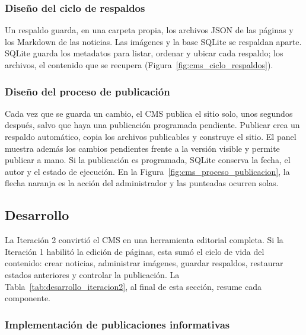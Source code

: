 

\subsubsection{Diseño del ciclo de respaldos}

Un respaldo guarda, en una carpeta propia, los archivos JSON de las páginas y los Markdown de las noticias. Las imágenes y la base SQLite se respaldan aparte. SQLite guarda los metadatos para listar, ordenar y ubicar cada respaldo; los archivos, el contenido que se recupera (Figura~\ref{fig:cms_ciclo_respaldos}).



\subsubsection{Diseño del proceso de publicación}

Cada vez que se guarda un cambio, el CMS publica el sitio solo, unos segundos después, salvo que haya una publicación programada pendiente. Publicar crea un respaldo automático, copia los archivos publicables y construye el sitio. El panel muestra además los cambios pendientes frente a la versión visible y permite publicar a mano. Si la publicación es programada, SQLite conserva la fecha, el autor y el estado de ejecución. En la Figura~\ref{fig:cms_proceso_publicacion}, la flecha naranja es la acción del administrador y las punteadas ocurren solas.



\subsection{Desarrollo}

La Iteración 2 convirtió el CMS en una herramienta editorial completa. Si la Iteración 1 habilitó la edición de páginas, esta sumó el ciclo de vida del contenido: crear noticias, administrar imágenes, guardar respaldos, restaurar estados anteriores y controlar la publicación. La Tabla~\ref{tab:desarrollo_iteracion2}, al final de esta sección, resume cada componente.

\subsubsection{Implementación de publicaciones informativas}

